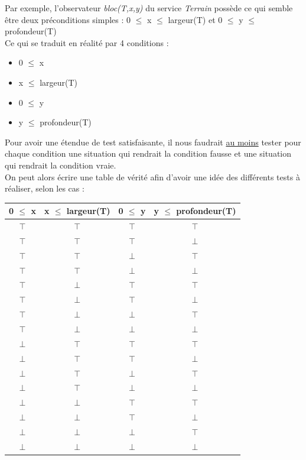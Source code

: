 \documentclass[a4paper, 11pt, notitlepage]{article}
\begin{document}
Par exemple, l'observateur \emph{bloc(T,x,y)} du service \emph{Terrain} possède ce qui semble être deux préconditions simples :  0 $\le$ x $\le$ largeur(T) et 0 $\le$ y $\le$ profondeur(T) \\


Ce qui se traduit en réalité par 4 conditions :
\begin{itemize}
\item 0 $\le$ x 
\item x $\le$ largeur(T)
\item 0 $\le$ y
\item y $\le$ profondeur(T) \\
 
 \end{itemize} 
 

 Pour avoir une étendue de test satisfaisante, il nous faudrait \underline{au moins} tester pour chaque condition une situation qui rendrait la condition fausse et une situation qui rendrait la condition vraie. \\
 
 On peut alors écrire une table de vérité afin d'avoir une idée des différents tests à réaliser, selon les cas :
 
 \begin{center}
   \begin{tabular}{ | c | c | c | c |}
     \hline
     0 $\le$ x &  x $\le$ largeur(T) & 0 $\le$ y &  y $\le$ profondeur(T) \\ \hline
    $\top$ & $\top$ & $\top$ & $\top$ \\ \hline
    $\top$ & $\top$ & $\top$ & $\bot$ \\ \hline
    $\top$ & $\top$ & $\bot$ & $\top$ \\ \hline
    $\top$ & $\top$ & $\bot$ & $\bot$ \\ \hline
    $\top$ & $\bot$ & $\top$ & $\top$ \\ \hline
    $\top$ & $\bot$ & $\top$ & $\bot$ \\ \hline
    $\top$ & $\bot$ & $\bot$ & $\top$ \\ \hline
    $\top$ & $\bot$ & $\bot$ & $\bot$ \\ \hline
    
    $\bot$ & $\top$ & $\top$ & $\top$ \\ \hline
    $\bot$ & $\top$ & $\top$ & $\bot$ \\ \hline
    $\bot$ & $\top$ & $\bot$ & $\top$ \\ \hline
    $\bot$ & $\top$ & $\bot$ & $\bot$ \\ \hline
    $\bot$ & $\bot$ & $\top$ & $\top$ \\ \hline
    $\bot$ & $\bot$ & $\top$ & $\bot$ \\ \hline
    $\bot$ & $\bot$ & $\bot$ & $\top$ \\ \hline
    $\bot$ & $\bot$ & $\bot$ & $\bot$ \\ \hline

   \end{tabular}
 \end{center}
\end{document}
